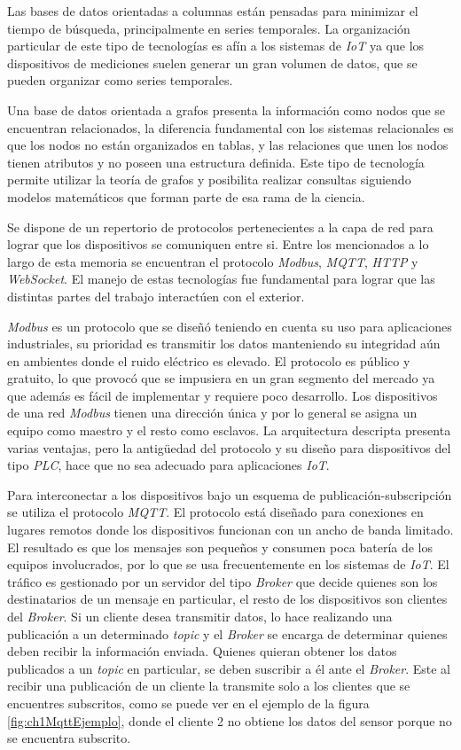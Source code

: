 Las bases de datos orientadas a columnas están pensadas para minimizar el tiempo de búsqueda, principalmente en series temporales.
La organización particular de este tipo de tecnologías es afín a los sistemas de \emph{IoT} ya que los dispositivos de mediciones suelen generar un gran volumen de datos, que se pueden organizar como series temporales.

Una base de datos orientada a grafos presenta la información como nodos que se encuentran relacionados, la diferencia fundamental con los sistemas relacionales es que los nodos no están organizados en tablas, y las relaciones que unen los nodos tienen atributos y no poseen una estructura definida.
Este tipo de tecnología permite utilizar la teoría de grafos y posibilita realizar consultas siguiendo modelos matemáticos que forman parte de esa rama de la ciencia.

Se dispone de un repertorio de protocolos pertenecientes a la capa de red para lograr que los dispositivos se comuniquen entre si.
Entre los mencionados a lo largo de esta memoria se encuentran el protocolo \emph{Modbus}, \emph{MQTT}, \emph{HTTP} y \emph{WebSocket}. El manejo de estas tecnologías fue fundamental para lograr que las distintas partes del trabajo interactúen con el exterior.

\emph{Modbus} es un protocolo que se diseñó teniendo en cuenta su uso para aplicaciones industriales, su prioridad es transmitir los datos manteniendo su integridad aún en ambientes donde el ruido eléctrico es elevado. El protocolo es público y gratuito, lo que provocó que se impusiera en un gran segmento del mercado ya que además es fácil de implementar y requiere poco desarrollo. Los dispositivos de una red \emph{Modbus} tienen una dirección única y por lo general se asigna un equipo como maestro y el resto como esclavos. La arquitectura descripta presenta varias ventajas, pero la antigüedad del protocolo y su diseño para dispositivos del tipo \emph{PLC}, hace que no sea adecuado para aplicaciones \emph{IoT}.

Para interconectar a los dispositivos bajo un esquema de publicación-subscripción se utiliza el protocolo \emph{MQTT}.
El protocolo está diseñado para conexiones en lugares remotos donde los dispositivos funcionan con un ancho de banda limitado.
El resultado es que los mensajes son pequeños y consumen poca batería de los equipos involucrados, por lo que se usa frecuentemente en los sistemas de \emph{IoT}.
El tráfico es gestionado por un servidor del tipo \emph{Broker} que decide quienes son los destinatarios de un mensaje en particular, el resto de los dispositivos son clientes del \emph{Broker}.
Si un cliente desea transmitir datos, lo hace realizando una publicación a un determinado \emph{topic} y el \emph{Broker} se encarga de determinar quienes deben recibir la información enviada.
Quienes quieran obtener los datos publicados a un \emph{topic} en particular, se deben suscribir a él ante el \emph{Broker}.
Este al recibir una publicación de un cliente la transmite solo a los clientes que se encuentres subscritos, como se puede ver en el ejemplo de la figura \ref{fig:ch1MqttEjemplo}, donde el cliente 2 no obtiene los datos del sensor porque no se encuentra subscrito.

